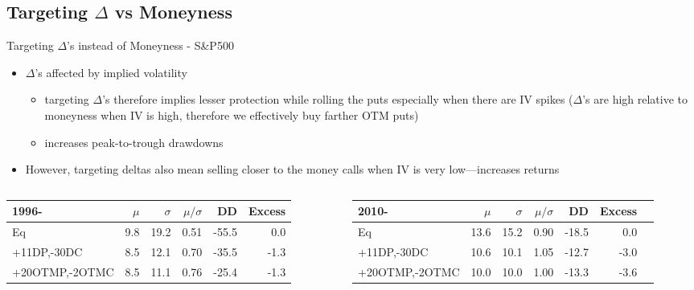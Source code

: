 \documentclass{beamer}
\begin{document}
\subsection{Targeting $\Delta$ vs Moneyness}
\begin{frame}{Targeting $\Delta$'s instead of Moneyness - S\&P500}

\begin{itemize}
\item $\Delta$'s affected by implied volatility
\begin{itemize}
\item targeting $\Delta$'s therefore implies lesser protection while rolling the puts especially when there are IV spikes ($\Delta$'s are high relative to moneyness when IV is high, therefore we effectively buy farther OTM puts)
\item increases peak-to-trough drawdowns 
\end{itemize}
\item However, targeting deltas also mean selling closer to the money calls when IV is very low---increases returns

\end{itemize}


\begin{columns}
\begin{column}{0.5\textwidth}
\scalebox{0.6} {
\begin{tabular}{lrrrrr}
\toprule
1996- & $\mu$ & $\sigma$ & $\mu/\sigma$ & DD & Excess\\
\midrule
Eq & 9.8 & 19.2 & 0.51 & -55.5 & 0.0\\
+11DP,-30DC & 8.5 & 12.1 & 0.70 & -35.5 & -1.3\\
+20OTMP,-2OTMC & 8.5 & 11.1 & 0.76 & -25.4 & -1.3\\
\bottomrule
\end{tabular}
}
\end{column}


\begin{column}{0.5\textwidth}
\scalebox{0.6} {
\begin{tabular}{lrrrrrr}
\toprule
2010- & $\mu$ & $\sigma$ & $\mu/\sigma$  & DD & Excess\\
\midrule
Eq & 13.6 & 15.2 & 0.90 &  -18.5 & 0.0\\
+11DP,-30DC & 10.6 & 10.1 & 1.05 &  -12.7 & -3.0\\
+20OTMP,-2OTMC & 10.0 & 10.0 & 1.00 &  -13.3 & -3.6\\
\bottomrule
\end{tabular}
}
\end{column}
\end{columns}

\end{frame}
\end{document}
